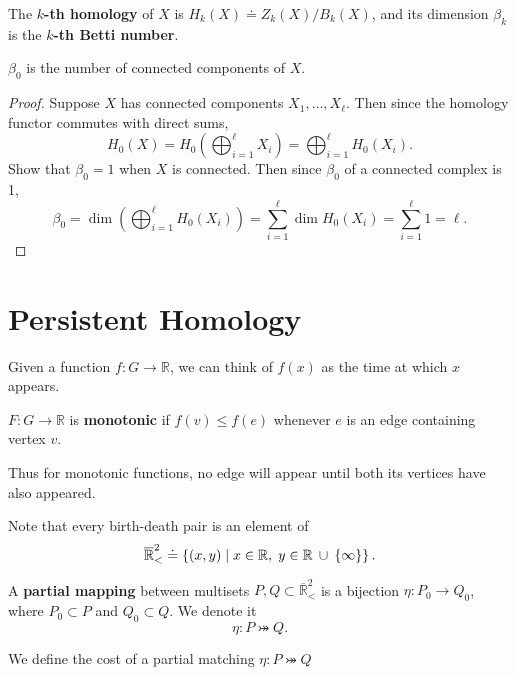 \documentclass[twoside,10pt]{article}
\begin{document}
\begin{defn}[]
	The \textbf{$k$-th homology} of $X$ is $H_{k}(X) \doteq Z_k(X) / B_k(X)$, and its dimension $\beta_{k}$ is the \textbf{$k$-th Betti number}.
\end{defn}

\begin{prop}
	$\beta_0$ is the number of connected components of $X$. 
\end{prop}
\begin{proof}
	Suppose $X$ has connected components $X_1, \dots, X_{\ell}$. Then since the homology functor commutes with direct sums,
	\[
		H_{0}(X) = H_{0}\left( \bigoplus_{i=1}^{\ell}X_{i} \right) = \bigoplus_{i=1}^{\ell}H_{0}(X_{i}).
	\] 
	{\color{blue}Show that $\beta_0=1$ when $X$ is connected.}
	Then since $\beta_0$ of a connected complex is 1,
	\[
		\beta_0 = \dim \left( \bigoplus_{i=1}^{\ell}H_{0}(X_i) \right) = \sum_{i=1}^{\ell} \dim H_0(X_{i}) = \sum_{i=1}^{\ell}1 = \ell.
	\] 
\end{proof}

\section{Persistent Homology}

Given a function $f:G\to \mathbb{R}$, we can think of $f(x)$ as the time at which $x$ appears.

\begin{defn}[]
	$F:G\to \mathbb{R}$ is \textbf{monotonic} if $f(v) \leq f(e)$ whenever $e$ is an edge containing vertex $v$. 
\end{defn}

Thus for monotonic functions, no edge will appear until both its vertices have also appeared.


Note that every birth-death pair is an element of
\[
	\overline{\mathbb{R}}_{<}^2 \doteq \left\{ (x,y) \;|\; x \in \mathbb{R}, \; y \in \mathbb{R} \operatorname{\;\cup\;} \left\{ \infty \right\} \right\}.
\] 

\begin{defn}[]
A \textbf{partial mapping} between {\color{red}multisets} $P,Q \subset \overline{\mathbb{R}}_{<}^2$ is a bijection $\eta: P_0 \to Q_0$, where $P_0 \subset P$ and $Q_0 \subset Q$. We denote it
\[
\eta: P\bij Q.
\] 
\end{defn}

We define the cost of a partial matching $\eta:P\bij Q$ 
\end{document}
